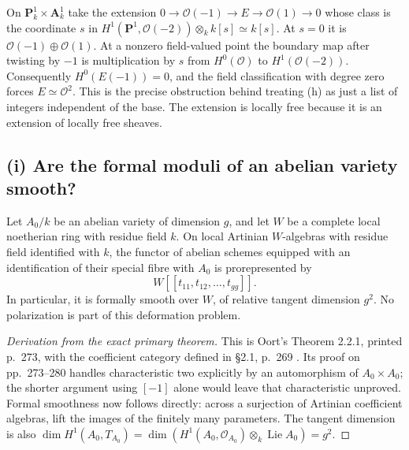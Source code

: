 \begin{example}
\label{geo-Kh-jump}
On $\mathbf P^1_k\times\mathbf A^1_k$ take the extension
$0\to\mathcal O(-1)\to E\to\mathcal O(1)\to0$
whose class is the coordinate $s$ in
$H^1(\mathbf P^1,\mathcal O(-2))\otimes_k k[s]\simeq k[s]$.
At $s=0$ it is $\mathcal O(-1)\oplus\mathcal O(1)$.
At a nonzero field-valued point the boundary map after twisting by $-1$
is multiplication by $s$ from $H^0(\mathcal O)$ to
$H^1(\mathcal O(-2))$. Consequently $H^0(E(-1))=0$, and the field
classification with degree zero forces $E\simeq\mathcal O^2$.
This is the precise obstruction behind treating (h) as just a list of
integers independent of the base. The extension is locally free because
it is an extension of locally free sheaves.
\end{example}

\subsection{(i) Are the formal moduli of an abelian variety smooth?}

\begin{theorem}
\label{geo-Ki}
Let $A_0/k$ be an abelian variety of dimension $g$, and let $W$ be a
complete local noetherian ring with residue field $k$. On local Artinian
$W$-algebras with residue field identified with $k$, the functor of abelian
schemes equipped with an identification of their special fibre with $A_0$
is prorepresented by
\[
 W[[t_{11},t_{12},\ldots,t_{gg}]].
\]
In particular, it is formally smooth over $W$, of relative tangent
dimension $g^2$. No polarization is part of this deformation problem.
\end{theorem}
\begin{proof}[Derivation from the exact primary theorem]
This is Oort's Theorem 2.2.1, printed p.~273, with the coefficient category
defined in \S2.1, p.~269 \cite{Oort1971}. Its proof on pp.~273--280
handles characteristic two explicitly by an automorphism of $A_0\times A_0$;
the shorter argument using $[-1]$ alone would leave that characteristic
unproved. Formal smoothness now follows directly: across a surjection of
Artinian coefficient algebras, lift the images of the finitely many
parameters. The tangent dimension is also
$\dim H^1(A_0,T_{A_0})=\dim(H^1(A_0,\mathcal O_{A_0})
\otimes_k\operatorname{Lie}A_0)=g^2$.
\end{proof}

